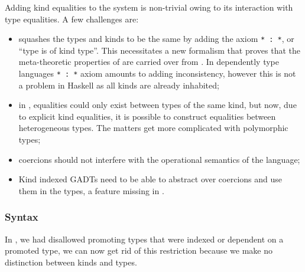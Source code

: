 \documentclass[screen,nonacm,manuscript,review]{acmart} %
\begin{document}
Adding kind equalities to the system is non-trivial owing to its interaction with type equalities. A few challenges are:
\begin{itemize}
 \item \SFK squashes the types and kinds to be the same by adding the axiom \lstinline{* : *}, or ``type is of kind type''. This necessitates a new formalism that proves that the meta-theoretic properties of \SFK are carried over from \SFC. In dependently type languages \lstinline{* : *} axiom amounts to adding inconsistency, however this is not a problem in Haskell as all kinds are already inhabited;
 \item in \SFC, equalities could only exist between types of the same kind, but now, due to explicit kind equalities, it is possible to construct equalities between heterogeneous types. The matters get more complicated with polymorphic types;
 \item coercions should not interfere with the operational semantics of the language;
 \item Kind indexed GADTs need to be able to abstract over coercions and use them in the types, a feature missing in \SFC.
\end{itemize}

\subsubsection{Syntax}\label{sec:sfk-syntax}
In \SFP, we had disallowed promoting types that were indexed or dependent on a promoted type, we can now get rid of this restriction because we make no distinction between kinds and types.
\end{document}
